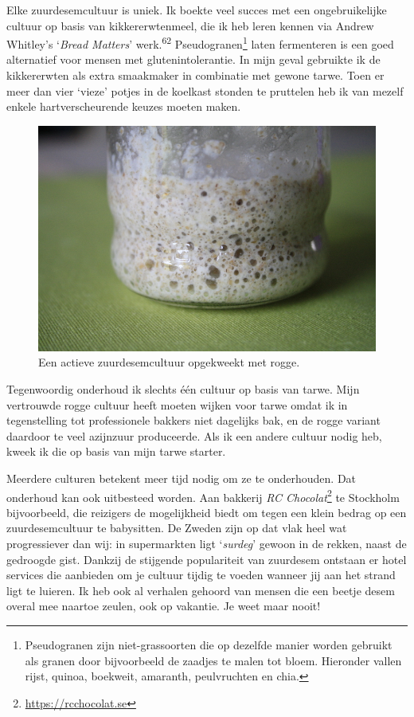\documentclass[
  11pt,
  dutch,
]{memoir}
\begin{document}
Elke zuurdesemcultuur is uniek. Ik boekte veel succes met een
ongebruikelijke cultuur op basis van kikkererwtenmeel, die ik heb leren
kennen via Andrew Whitley's `\emph{Bread Matters}'
werk.\textsuperscript{62} Pseudogranen\footnote{Pseudogranen zijn
  niet-grassoorten die op dezelfde manier worden gebruikt als granen
  door bijvoorbeeld de zaadjes te malen tot bloem. Hieronder vallen
  rijst, quinoa, boekweit, amaranth, peulvruchten en chia.} laten
fermenteren is een goed alternatief voor mensen met glutenintolerantie.
In mijn geval gebruikte ik de kikkererwten als extra smaakmaker in
combinatie met gewone tarwe. Toen er meer dan vier `vieze' potjes in de
koelkast stonden te pruttelen heb ik van mezelf enkele hartverscheurende
keuzes moeten maken.

\begin{figure}
    \centering
    \includegraphics{img/bw/broebel.jpg}
    \caption[Een rogge zuurdesemcultuur.]{Een actieve zuurdesemcultuur opgekweekt met rogge.}
\end{figure}

Tegenwoordig onderhoud ik slechts één cultuur op basis van tarwe. Mijn
vertrouwde rogge cultuur heeft moeten wijken voor tarwe omdat ik in
tegenstelling tot professionele bakkers niet dagelijks bak, en de rogge
variant daardoor te veel azijnzuur produceerde. Als ik een andere
cultuur nodig heb, kweek ik die op basis van mijn tarwe starter.

Meerdere culturen betekent meer tijd nodig om ze te onderhouden. Dat
onderhoud kan ook uitbesteed worden. Aan bakkerij \emph{RC
Chocolat}\footnote{\url{https://rcchocolat.se}} te Stockholm
bijvoorbeeld, die reizigers de mogelijkheid biedt om tegen een klein
bedrag op een zuurdesemcultuur te babysitten. De Zweden zijn op dat vlak
heel wat progressiever dan wij: in supermarkten ligt `\emph{surdeg}'
gewoon in de rekken, naast de gedroogde gist. Dankzij de stijgende
populariteit van zuurdesem ontstaan er hotel services die aanbieden om
je cultuur tijdig te voeden wanneer jij aan het strand ligt te luieren.
Ik heb ook al verhalen gehoord van mensen die een beetje desem overal
mee naartoe zeulen, ook op vakantie. Je weet maar nooit!
\end{document}
